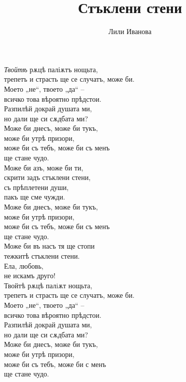 \documentclass{article}
\title{Стъклени стени}
\author{Лили Иванова}
\begin{document}
\maketitle

 \textit{Твойтѣ} рѫцѣ паліѫтъ нощьта,\\
 трепетъ и страсть ще се случатъ, може би. \\
 Моето „не“, твоето „да“ -- \\
 всичко това вѣроятно прѣдстои. \\
 
 Разпилѣй докрай душата ми, \\
 но дали ще си сѫдбата ми? \\
 
 Може би днесъ, може би тукъ, \\
 може би утрѣ призори, \\
 може би съ тебъ, може би съ менъ \\
 ще стане чудо. \\
 
 Може би азъ, може би ти, \\
 скрити задъ стъклени стени, \\
 съ прѣплетени души, \\
 пакъ ще сме чужди. \\
 
 Може би днесъ, може би тукъ, \\
 може би утрѣ призори, \\
 може би съ тебъ, може би съ менъ \\
 ще стане чудо. \\
 
 Може би въ насъ тя ще стопи \\
 тежкитѣ стъклени стени. \\
 Ела, любовь, \\
 не искамъ друго! \\
 
 Твойтѣ рѫцѣ палiѫт нощьта, \\
 трепетъ и страсть ще се случатъ, може би. \\
 Моето „не“, твоето „да“ -- \\
 всичко това вѣроятно прѣдстои. \\
 
 Разпилѣй докрай душата ми, \\
 но дали ще си сѫдбата ми? \\
 
 Може би днесъ, може би тукъ, \\
 може би утрѣ призори, \\
 може би съ тебъ, може би с менъ \\
 ще стане чудо. \\
 
\end{document}
